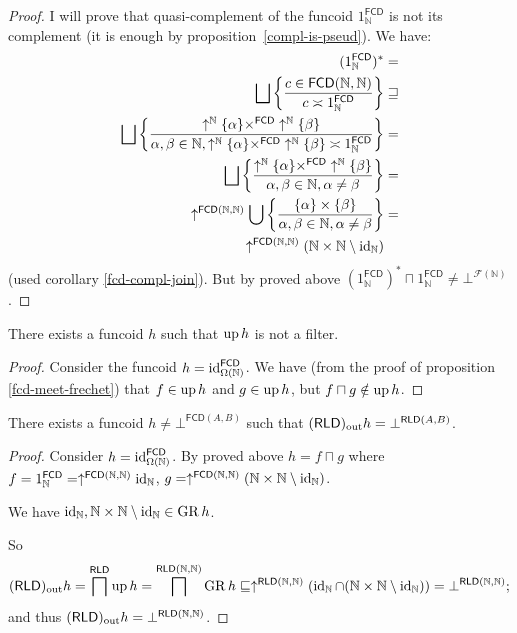 \begin{proof}
I will prove that quasi-complement of the funcoid $1_{\mathbb{N}}^{\mathsf{FCD}}$
is not its complement (it is enough by proposition~\ref{compl-is-pseud}). We have:
\begin{align*}
(1_{\mathbb{N}}^{\mathsf{FCD}})^{\ast} & =\\
\bigsqcup\setcond{c\in\mathsf{FCD}(\mathbb{N},\mathbb{N})}{c\asymp1_{\mathbb{N}}^{\mathsf{FCD}}} & \sqsupseteq\\
\bigsqcup\setcond{\uparrow^{\mathbb{N}}\{\alpha\}\times^{\mathsf{FCD}}\uparrow^{\mathbb{N}}\{\beta\}}{\alpha,\beta\in\mathbb{N},\uparrow^{\mathbb{N}}\{\alpha\}\times^{\mathsf{FCD}}\uparrow^{\mathbb{N}}\{\beta\}\asymp1_{\mathbb{N}}^{\mathsf{FCD}}} & =\\
\bigsqcup\setcond{\uparrow^{\mathbb{N}}\{\alpha\}\times^{\mathsf{FCD}}\uparrow^{\mathbb{N}}\{\beta\}}{\alpha,\beta\in\mathbb{N},\alpha\ne\beta} & =\\
\uparrow^{\mathsf{FCD}(\mathbb{N},\mathbb{N})}\bigcup\setcond{\{\alpha\}\times\{\beta\}}{\alpha,\beta\in\mathbb{N},\alpha\ne\beta} & =\\
\uparrow^{\mathsf{FCD}(\mathbb{N},\mathbb{N})}(\mathbb{N}\times\mathbb{N}\setminus\id_{\mathbb{N}})
\end{align*}
(used corollary \ref{fcd-compl-join}). But by proved above $(1_{\mathbb{N}}^{\mathsf{FCD}})^{\ast}\sqcap1_{\mathbb{N}}^{\mathsf{FCD}}\ne\bot^{\mathscr{F}(\mathbb{N})}$.\end{proof}
\begin{example}
There exists a funcoid $h$ such that $\operatorname{up} h$ is not a filter.\end{example}
\begin{proof}
Consider the funcoid $h=\operatorname{id}_{\Omega(\mathbb{N})}^{\mathsf{FCD}}$.
We have (from the proof of proposition \ref{fcd-meet-frechet}) that
$f\in\operatorname{up} h$ and $g\in\operatorname{up} h$, but $f\sqcap g\notin\operatorname{up} h$.\end{proof}
\begin{example}
There exists a funcoid $h\ne\bot^{\mathsf{FCD}(A,B)}$ such that $(\mathsf{RLD})_{\mathrm{out}} h=\bot^{\mathsf{RLD}(A,B)}$.\end{example}
\begin{proof}
Consider $h=\operatorname{id}_{\Omega(\mathbb{N})}^{\mathsf{FCD}}$. By proved above
$h=f\sqcap g$ where $f=1_{\mathbb{N}}^{\mathsf{FCD}}=\uparrow^{\mathsf{FCD}(\mathbb{N},\mathbb{N})}\operatorname{id}_{\mathbb{N}}$,
$g=\uparrow^{\mathsf{FCD}(\mathbb{N},\mathbb{N})}(\mathbb{N}\times\mathbb{N}\setminus\operatorname{id}_{\mathbb{N}})$.

We have $\operatorname{id}_{\mathbb{N}},\mathbb{N}\times\mathbb{N}\setminus\operatorname{id}_{\mathbb{N}}\in\operatorname{GR} h$.

So
\[
(\mathsf{RLD})_{\mathrm{out}} h=\bigsqcap^{\mathsf{RLD}}\operatorname{up} h=\bigsqcap^{\mathsf{RLD}(\mathbb{N},\mathbb{N})}\operatorname{GR} h\sqsubseteq\uparrow^{\mathsf{RLD}(\mathbb{N},\mathbb{N})}(\operatorname{id}_{\mathbb{N}}\cap(\mathbb{N}\times\mathbb{N}\setminus\operatorname{id}_{\mathbb{N}}))=\bot^{\mathsf{RLD}(\mathbb{N},\mathbb{N})};
\]
and thus $(\mathsf{RLD})_{\mathrm{out}} h=\bot^{\mathsf{RLD}(\mathbb{N},\mathbb{N})}$.\end{proof}
